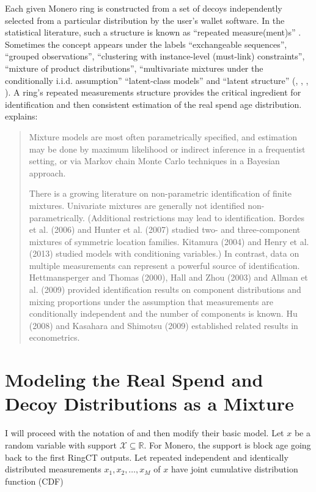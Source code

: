 \documentclass[english]{article}
\begin{document}
Each given Monero ring is constructed from a set of decoys independently
selected from a particular distribution by the user's wallet software.
In the statistical literature, such a structure is known as ``repeated
measure(ment)s'' \cite{crowder1990analysis}. Sometimes the concept
appears under the labels ``exchangeable sequences'', ``grouped
observations'', ``clustering with instance-level (must-link) constraints'',
``mixture of product distributions'', ``multivariate mixtures under
the conditionally i.i.d. assumption'' ``latent-class models'' and
``latent structure'' (\cite{AllmanMatiasRhodes2009}, \cite{BenagliaJSS2009},
\cite{ritchie2020consistent}, \cite{WeiNguyendeFinetti2022}). A
ring's repeated measurements structure provides the critical ingredient
for identification and then consistent estimation of the real spend
age distribution.\cite{Bonhomme2016} explains:
\begin{quote}
Mixture models are most often parametrically specified, and estimation
may be done by maximum likelihood or indirect inference in a frequentist
setting, or via Markov chain Monte Carlo techniques in a Bayesian
approach.

There is a growing literature on non-parametric identification of
finite mixtures. Univariate mixtures are generally not identified
non-parametrically. (Additional restrictions may lead to identification.
Bordes et al. (2006) and Hunter et al. (2007) studied two- and three-component
mixtures of symmetric location families. Kitamura (2004) and Henry
et al. (2013) studied models with conditioning variables.) In contrast,
data on multiple measurements can represent a powerful source of identification.
Hettmansperger and Thomas (2000), Hall and Zhou (2003) and Allman
et al. (2009) provided identification results on component distributions
and mixing proportions under the assumption that measurements are
conditionally independent and the number of components is known. Hu
(2008) and Kasahara and Shimotsu (2009) established related results
in econometrics.
\end{quote}

\section{Modeling the Real Spend and Decoy Distributions as a Mixture\label{sec:Modeling-the-Real-Spend}}

I will proceed with the notation of \cite{Bonhomme2016} and then
modify their basic model. Let $x$ be a random variable with support
$\mathcal{X}\subseteq\mathbb{R}$. For Monero, the support is block
age going back to the first RingCT outputs. Let repeated independent
and identically distributed measurements $x_{1},x_{2},\ldots,x_{M}$
of $x$ have joint cumulative distribution function (CDF)
\end{document}
